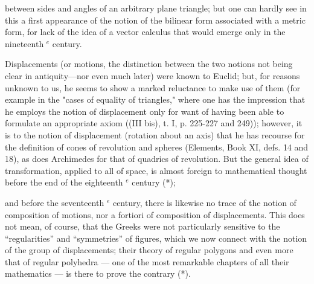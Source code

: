between sides and angles of an arbitrary plane triangle; but one can hardly see in this a first appearance of the notion of the bilinear form associated with a metric form, for lack of the idea of a vector calculus that would emerge only in the nineteenth \(^{e}\) century.

Displacements (or motions, the distinction between the two notions not being clear in antiquity---nor even much later) were known to Euclid; but, for reasons unknown to us, he seems to show a marked reluctance to make use of them (for example in the "cases of equality of triangles," where one has the impression that he employs the notion of displacement only for want of having been able to formulate an appropriate axiom ((III bis), t. I, p. 225-227 and 249)); however, it is to the notion of displacement (rotation about an axis) that he has recourse for the definition of cones of revolution and spheres (Elements, Book XI, defs. 14 and 18), as does Archimedes for that of quadrics of revolution. But the general idea of transformation, applied to all of space, is almost foreign to mathematical thought before the end of the eighteenth \(^{e}\) century (*);

and before the seventeenth \(^{e}\) century, there is likewise no trace of the notion of composition of motions, nor a fortiori of composition of displacements. This does not mean, of course, that the Greeks were not particularly sensitive to the “regularities” and “symmetries” of figures, which we now connect with the notion of the group of displacements; their theory of regular polygons and even more that of regular polyhedra — one of the most remarkable chapters of all their mathematics — is there to prove the contrary (*).

